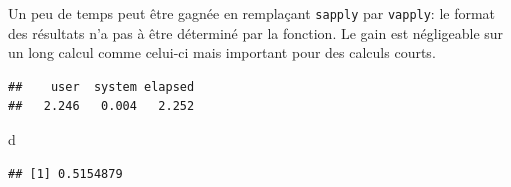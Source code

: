 \documentclass[
  12pt,
  french,
  a4paper,
  extrafontsizes,onecolumn,openright
  ]{memoir}
\newenvironment{Shaded}{\begin{snugshade}}{\end{snugshade}}
\newcommand{\AttributeTok}[1]{\textcolor[rgb]{0.13,0.29,0.53}{#1}}
\newcommand{\ControlFlowTok}[1]{\textcolor[rgb]{0.13,0.29,0.53}{\textbf{#1}}}
\newcommand{\DecValTok}[1]{\textcolor[rgb]{0.00,0.00,0.81}{#1}}
\newcommand{\FunctionTok}[1]{\textcolor[rgb]{0.13,0.29,0.53}{\textbf{#1}}}
\newcommand{\NormalTok}[1]{#1}
\newcommand{\OtherTok}[1]{\textcolor[rgb]{0.56,0.35,0.01}{#1}}
\newcommand{\SpecialCharTok}[1]{\textcolor[rgb]{0.81,0.36,0.00}{\textbf{#1}}}
\begin{document}
Un peu de temps peut être gagnée en remplaçant \texttt{sapply} par \texttt{vapply}: le format des résultats n'a pas à être déterminé par la fonction.
Le gain est négligeable sur un long calcul comme celui-ci mais important pour des calculs courts.

\scriptsize

\begin{Shaded}
\end{Shaded}

\begin{verbatim}
##    user  system elapsed 
##   2.246   0.004   2.252
\end{verbatim}

\begin{Shaded}
\begin{Highlighting}[]
\NormalTok{d}
\end{Highlighting}
\end{Shaded}

\begin{verbatim}
## [1] 0.5154879
\end{verbatim}
\end{document}
